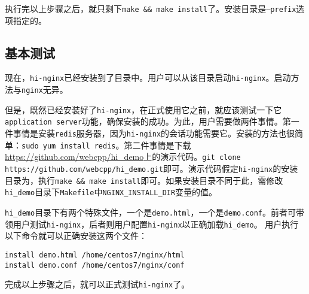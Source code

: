 执行完以上步骤之后，就只剩下\texttt{make \&\& make install}了。安装目录是\texttt{--prefix}选项指定的。


\subsection{基本测试}
现在，\texttt{hi-nginx}已经安装到了目录中。用户可以从该目录启动\texttt{hi-nginx}。启动方法与\texttt{nginx}无异。

但是，既然已经安装好了\texttt{hi-nginx}，在正式使用它之前，就应该测试一下它\texttt{application server}功能，确保安装的成功。为此，用户需要做两件事情。第一件事情是安装\texttt{redis}服务器，因为\texttt{hi-nginx}的会话功能需要它。安装的方法也很简单：\texttt{sudo yum install redis}。第二件事情是下载\url{https://github.com/webcpp/hi_demo}上的演示代码。\texttt{git clone https://github.com/webcpp/hi_demo.git}即可。演示代码假定\texttt{hi-nginx}的安装目录为，执行\texttt{make \&\& make install}即可。如果安装目录不同于此，需修改\texttt{hi_demo}目录下\texttt{Makefile}中\texttt{NGINX_INSTALL_DIR}变量的值。

\texttt{hi_demo}目录下有两个特殊文件，一个是\texttt{demo.html}，一个是\texttt{demo.conf}。前者可带领用户测试\texttt{hi-nginx}，后者则用户配置\texttt{hi-nginx}以正确加载\texttt{hi_demo}。
用户执行以下命令就可以正确安装这两个文件：
\begin{lstlisting}
install demo.html /home/centos7/nginx/html
install demo.conf /home/centos7/nginx/conf
\end{lstlisting}
完成以上步骤之后，就可以正式测试\texttt{hi-nginx}了。

